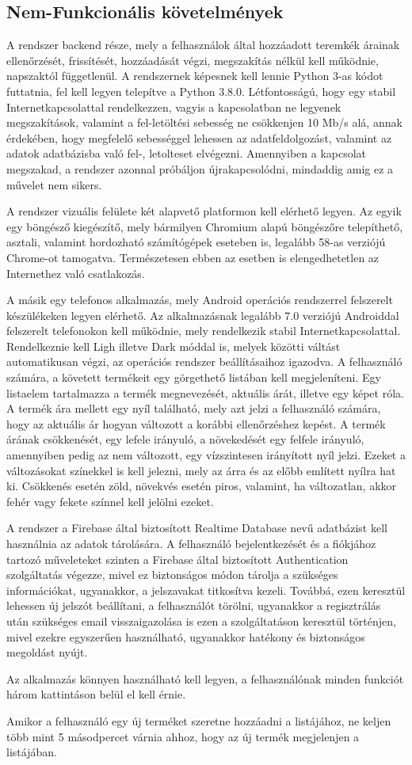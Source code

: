 \subsection{Nem-Funkcionális követelmények}

A rendszer backend része, mely a felhasználok által hozzáadott teremkék árainak ellenőrzését, frissítését, hozzáadását végzi, megszakítás nélkül kell működnie, napszaktól függetlenül. A rendszernek képesnek kell lennie Python 3-as kódot futtatnia, fel kell legyen telepítve a Python 3.8.0. Létfontosságú, hogy egy stabil Internetkapcsolattal rendelkezzen, vagyis a kapcsolatban ne legyenek megszakítások, valamint a fel-letöltési sebesség ne csökkenjen 10 Mb/s alá, annak érdekében, hogy megfelelő sebességgel lehessen az adatfeldolgozást, valamint az adatok adatbázisba való fel-, letolteset elvégezni. Amennyiben a kapcsolat megszakad, a rendszer azonnal próbáljon újrakapcsolódni, mindaddig amig ez a művelet nem sikers.

A rendszer vizuális felülete két alapvető platformon kell elérhető legyen. Az egyik egy böngésző kiegészítő, mely bármilyen Chromium alapú böngészőre telepíthető, asztali, valamint hordozható számítógépek eseteben is, legalább 58-as verziójú Chrome-ot tamogatva. Természetesen ebben az esetben is elengedhetetlen az Internethez való csatlakozás.

A másik egy telefonos alkalmazás, mely Android operációs rendszerrel felszerelt készülékeken legyen elérhető. Az alkalmazásnak legalább 7.0 verziójú Androiddal felszerelt telefonokon kell működnie, mely rendelkezik stabil Internetkapcsolattal. Rendelkeznie kell Ligh illetve Dark móddal is, melyek közötti váltást automatikusan végzi, az operációs rendszer beállításaihoz igazodva. A felhasználó számára, a követett termékeit egy görgethető listában kell megjeleníteni. Egy listaelem tartalmazza a termék megnevezését, aktuális árát, illetve egy képet róla. A termék ára mellett egy nyíl található, mely azt jelzi a felhasználó számára, hogy az aktuális ár hogyan változott a korábbi ellenőrzéshez kepést. A termék árának csökkenését, egy lefele irányuló, a növekedését egy felfele irányuló, amennyiben pedig az nem változott, egy vízszintesen irányított nyíl jelzi. Ezeket a változásokat színekkel is kell jelezni, mely az árra és az előbb említett nyílra hat ki. Csökkenés esetén zöld, növekvés esetén piros, valamint, ha változatlan, akkor fehér vagy fekete színnel kell jelölni ezeket.

A rendszer a Firebase által biztosított Realtime Database nevű adatbázist kell használnia az adatok tárolására. A felhasználó bejelentkezését és a fiókjához tartozó műveleteket szinten a Firebase által biztosított Authentication szolgáltatás végezze, mivel ez biztonságos módon tárolja a szükséges információkat, ugyanakkor, a jelszavakat titkosítva kezeli. Továbbá, ezen keresztül lehessen új jelszót beállítani, a felhasználót törölni, ugyanakkor a regisztrálás után szükséges email visszaigazolása is ezen a szolgáltatáson keresztül történjen, mivel ezekre egyszerűen használható, ugyanakkor hatékony és biztonságos megoldást nyújt.

Az alkalmazás könnyen használható kell legyen, a felhasználónak minden funkciót három kattintáson belül el kell érnie. 

Amikor a felhasználó egy új terméket szeretne hozzáadni a listájához, ne keljen több mint 5 másodpercet várnia ahhoz, hogy az új termék megjelenjen a listájában. 
